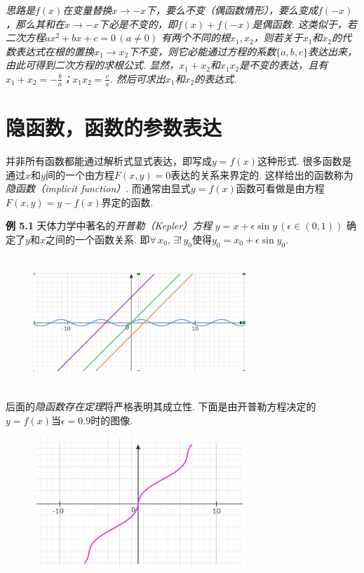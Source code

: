 \documentclass{article}
\begin{document}
\textit{思路是$f(x)$在变量替换$x\to -x$下，要么不变（偶函数情形），要么变成$f(-x)$，那么其和在$x\to -x$下必是不变的，即$f(x)+f(-x)$是偶函数. 这类似于，若二次方程$ax^{2}+bx+c=0\,(a\neq 0)$ 有两个不同的根$x_{1},x_{2}$，则若关于$x_{1}$和$x_{2}$的代数表达式在根的置换$x_{1}\to x_{2}$下不变，则它必能通过方程的系数$\{a,b,c\}$表达出来，由此可得到二次方程的求根公式. 显然，$x_{1}+x_{2}$和$x_{1}x_{2}$是不变的表达，且有$x_{1}+x_{2}=-\frac{b}{a}$；$x_{1}x_{2}=\frac{c}{a}$. 然后可求出$x_{1}$和$x_{2}$的表达式.}




\section{隐函数，函数的参数表达}

并非所有函数都能通过解析式显式表达，即写成$y=f(x)$这种形式. 很多函数是通过$x$和$y$间的一个由方程$F(x,y)=0$表达的关系来界定的. 这样给出的函数称为\textit{隐函数（implicit function）}. 而通常由显式$y=f(x)$函数可看做是由方程$F(x,y)=y-f(x)$界定的函数. 

\vspace{3pt}

\textbf{例 5.1} 天体力学中著名的\textit{开普勒（Kepler）方程} $y=x+\epsilon\sin{y}\,(\epsilon\in(0,1))$ 确定了$y$和$x$之间的一个函数关系. 即$\forall\,x_{0},\,\exists!\,y_{0}$使得$y_{0}=x_{0}+\epsilon\sin{y_{0}}$.

\begin{figure}[h]
\includegraphics[height=4.9cm,width=8cm]{凸显.PNG}
\centering
\end{figure}

后面的\textit{隐函数存在定理}将严格表明其成立性. 下面是由开普勒方程决定的$y=f(x)$当$\epsilon=0.9$时的图像.


\begin{figure}[h]
\includegraphics[height=4.9cm,width=8cm]{kepler.PNG}
\centering
\end{figure}
\end{document}
